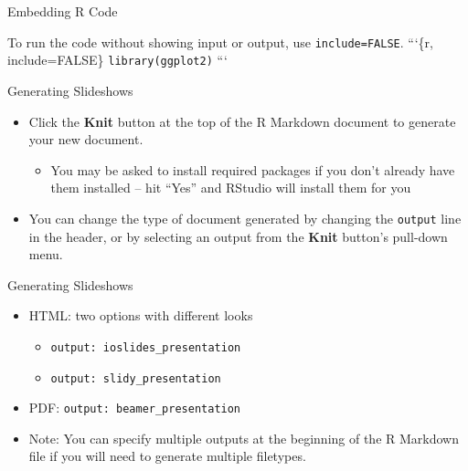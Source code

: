 \documentclass[
  ignorenonframetext,
]{beamer}
\providecommand{\tightlist}{%
  \setlength{\itemsep}{0pt}\setlength{\parskip}{0pt}}
\begin{document}
\begin{frame}[fragile]{Embedding R Code}
\protect\hypertarget{embedding-r-code-3}{}

To run the code without showing input or output, use
\texttt{include=FALSE}. ```\{r, include=FALSE\}
\texttt{library(ggplot2)} ```

\end{frame}

\begin{frame}[fragile]{Generating Slideshows}
\protect\hypertarget{generating-slideshows}{}

\begin{itemize}
\tightlist
\item
  Click the \textbf{Knit} button at the top of the R Markdown document
  to generate your new document.

  \begin{itemize}
  \tightlist
  \item
    You may be asked to install required packages if you don't already
    have them installed -- hit ``Yes'' and RStudio will install them for
    you
  \end{itemize}
\item
  You can change the type of document generated by changing the
  \texttt{output} line in the header, or by selecting an output from the
  \textbf{Knit} button's pull-down menu.
\end{itemize}

\end{frame}

\begin{frame}[fragile]{Generating Slideshows}
\protect\hypertarget{generating-slideshows-1}{}

\begin{itemize}
\tightlist
\item
  HTML: two options with different looks

  \begin{itemize}
  \tightlist
  \item
    \texttt{output:\ ioslides\_presentation}
  \item
    \texttt{output:\ slidy\_presentation}
  \end{itemize}
\item
  PDF: \texttt{output:\ beamer\_presentation}\\
\item
  Note: You can specify multiple outputs at the beginning of the R
  Markdown file if you will need to generate multiple filetypes.
\end{itemize}

\end{frame}
\end{document}

